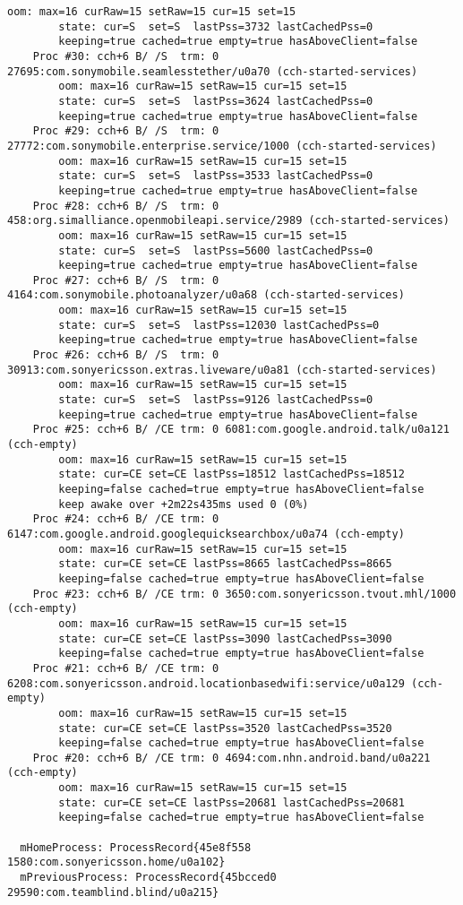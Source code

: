 \begin{lstlisting}[frame=single]
        oom: max=16 curRaw=15 setRaw=15 cur=15 set=15
        state: cur=S  set=S  lastPss=3732 lastCachedPss=0
        keeping=true cached=true empty=true hasAboveClient=false
    Proc #30: cch+6 B/ /S  trm: 0 27695:com.sonymobile.seamlesstether/u0a70 (cch-started-services)
        oom: max=16 curRaw=15 setRaw=15 cur=15 set=15
        state: cur=S  set=S  lastPss=3624 lastCachedPss=0
        keeping=true cached=true empty=true hasAboveClient=false
    Proc #29: cch+6 B/ /S  trm: 0 27772:com.sonymobile.enterprise.service/1000 (cch-started-services)
        oom: max=16 curRaw=15 setRaw=15 cur=15 set=15
        state: cur=S  set=S  lastPss=3533 lastCachedPss=0
        keeping=true cached=true empty=true hasAboveClient=false
    Proc #28: cch+6 B/ /S  trm: 0 458:org.simalliance.openmobileapi.service/2989 (cch-started-services)
        oom: max=16 curRaw=15 setRaw=15 cur=15 set=15
        state: cur=S  set=S  lastPss=5600 lastCachedPss=0
        keeping=true cached=true empty=true hasAboveClient=false
    Proc #27: cch+6 B/ /S  trm: 0 4164:com.sonymobile.photoanalyzer/u0a68 (cch-started-services)
        oom: max=16 curRaw=15 setRaw=15 cur=15 set=15
        state: cur=S  set=S  lastPss=12030 lastCachedPss=0
        keeping=true cached=true empty=true hasAboveClient=false
    Proc #26: cch+6 B/ /S  trm: 0 30913:com.sonyericsson.extras.liveware/u0a81 (cch-started-services)
        oom: max=16 curRaw=15 setRaw=15 cur=15 set=15
        state: cur=S  set=S  lastPss=9126 lastCachedPss=0
        keeping=true cached=true empty=true hasAboveClient=false
    Proc #25: cch+6 B/ /CE trm: 0 6081:com.google.android.talk/u0a121 (cch-empty)
        oom: max=16 curRaw=15 setRaw=15 cur=15 set=15
        state: cur=CE set=CE lastPss=18512 lastCachedPss=18512
        keeping=false cached=true empty=true hasAboveClient=false
        keep awake over +2m22s435ms used 0 (0%)
    Proc #24: cch+6 B/ /CE trm: 0 6147:com.google.android.googlequicksearchbox/u0a74 (cch-empty)
        oom: max=16 curRaw=15 setRaw=15 cur=15 set=15
        state: cur=CE set=CE lastPss=8665 lastCachedPss=8665
        keeping=false cached=true empty=true hasAboveClient=false
    Proc #23: cch+6 B/ /CE trm: 0 3650:com.sonyericsson.tvout.mhl/1000 (cch-empty)
        oom: max=16 curRaw=15 setRaw=15 cur=15 set=15
        state: cur=CE set=CE lastPss=3090 lastCachedPss=3090
        keeping=false cached=true empty=true hasAboveClient=false
    Proc #21: cch+6 B/ /CE trm: 0 6208:com.sonyericsson.android.locationbasedwifi:service/u0a129 (cch-empty)
        oom: max=16 curRaw=15 setRaw=15 cur=15 set=15
        state: cur=CE set=CE lastPss=3520 lastCachedPss=3520
        keeping=false cached=true empty=true hasAboveClient=false
    Proc #20: cch+6 B/ /CE trm: 0 4694:com.nhn.android.band/u0a221 (cch-empty)
        oom: max=16 curRaw=15 setRaw=15 cur=15 set=15
        state: cur=CE set=CE lastPss=20681 lastCachedPss=20681
        keeping=false cached=true empty=true hasAboveClient=false

  mHomeProcess: ProcessRecord{45e8f558 1580:com.sonyericsson.home/u0a102}
  mPreviousProcess: ProcessRecord{45bcced0 29590:com.teamblind.blind/u0a215}
\end{lstlisting}


